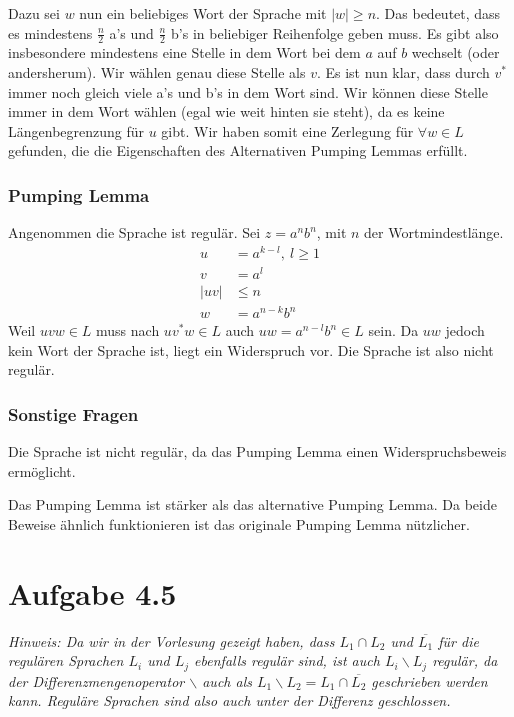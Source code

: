 \documentclass{article}
\begin{document}
Dazu sei $w$ nun ein beliebiges Wort der Sprache mit $|w|\geq n$. Das bedeutet, dass es mindestens $\frac{n}{2}$ a's und $\frac{n}{2}$ b's in beliebiger Reihenfolge geben muss. Es gibt also insbesondere mindestens eine Stelle in dem Wort bei dem $a$ auf $b$ wechselt (oder andersherum). Wir wählen genau diese Stelle als $v$. Es ist nun klar, dass durch $v^*$ immer noch gleich viele a's und b's in dem Wort sind. Wir können diese Stelle immer in dem Wort wählen (egal wie weit hinten sie steht), da es keine Längenbegrenzung für $u$ gibt. Wir haben somit eine Zerlegung für $\forall w \in L$ gefunden, die die Eigenschaften des Alternativen Pumping Lemmas erfüllt.

\subsubsection*{Pumping Lemma}
Angenommen die Sprache ist regulär. Sei $z = a^nb^n$, mit $n$ der Wortmindestlänge. 
\setcounter{equation}{0}
\begin{align}
   u &= a^{k-l},\ l \geq 1 \\
   v &= a^l \\
|uv| &\leq n \\
   w &= a^{n-k}b^n
\end{align}
Weil $uvw \in L$ muss nach $uv^*w \in L$ auch $uw = a^{n-l}b^n \in L$ sein. Da $uw$ jedoch kein Wort der Sprache ist, liegt ein Widerspruch vor. Die Sprache ist also nicht regulär.

\subsubsection*{Sonstige Fragen}
Die Sprache ist nicht regulär, da das Pumping Lemma einen Widerspruchsbeweis ermöglicht.

Das Pumping Lemma ist stärker als das alternative Pumping Lemma. Da beide Beweise ähnlich funktionieren ist das originale Pumping Lemma nützlicher.



\section*{Aufgabe 4.5}
\textit{Hinweis: Da wir in der Vorlesung gezeigt haben, dass $L_1 \cap L_2$ und $\overline{L_1}$ für die regulären Sprachen $L_i$ und $L_j$ ebenfalls regulär sind, ist auch $L_i \backslash L_j$ regulär, da der Differenzmengenoperator $\backslash$ auch als $L_1 \backslash L_2 = L_1 \cap \overline{L_2}$ geschrieben werden kann. Reguläre Sprachen sind also auch unter der Differenz geschlossen.}
\end{document}
